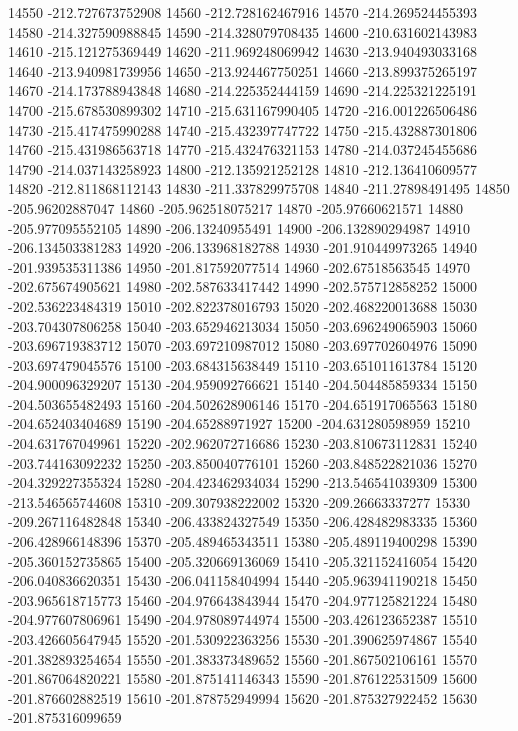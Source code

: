 {14550 -212.727673752908
14560 -212.728162467916
14570 -214.269524455393
14580 -214.327590988845
14590 -214.328079708435
14600 -210.631602143983
14610 -215.121275369449
14620 -211.969248069942
14630 -213.940493033168
14640 -213.940981739956
14650 -213.924467750251
14660 -213.899375265197
14670 -214.173788943848
14680 -214.225352444159
14690 -214.225321225191
14700 -215.678530899302
14710 -215.631167990405
14720 -216.001226506486
14730 -215.417475990288
14740 -215.432397747722
14750 -215.432887301806
14760 -215.431986563718
14770 -215.432476321153
14780 -214.037245455686
14790 -214.037143258923
14800 -212.135921252128
14810 -212.136410609577
14820 -212.811868112143
14830 -211.337829975708
14840 -211.27898491495
14850 -205.96202887047
14860 -205.962518075217
14870 -205.97660621571
14880 -205.977095552105
14890 -206.13240955491
14900 -206.132890294987
14910 -206.134503381283
14920 -206.133968182788
14930 -201.910449973265
14940 -201.939535311386
14950 -201.817592077514
14960 -202.67518563545
14970 -202.675674905621
14980 -202.587633417442
14990 -202.575712858252
15000 -202.536223484319
15010 -202.822378016793
15020 -202.468220013688
15030 -203.704307806258
15040 -203.652946213034
15050 -203.696249065903
15060 -203.696719383712
15070 -203.697210987012
15080 -203.697702604976
15090 -203.697479045576
15100 -203.684315638449
15110 -203.651011613784
15120 -204.900096329207
15130 -204.959092766621
15140 -204.504485859334
15150 -204.503655482493
15160 -204.502628906146
15170 -204.651917065563
15180 -204.652403404689
15190 -204.65288971927
15200 -204.631280598959
15210 -204.631767049961
15220 -202.962072716686
15230 -203.810673112831
15240 -203.744163092232
15250 -203.850040776101
15260 -203.848522821036
15270 -204.329227355324
15280 -204.423462934034
15290 -213.546541039309
15300 -213.546565744608
15310 -209.307938222002
15320 -209.26663337277
15330 -209.267116482848
15340 -206.433824327549
15350 -206.428482983335
15360 -206.428966148396
15370 -205.489465343511
15380 -205.489119400298
15390 -205.360152735865
15400 -205.320669136069
15410 -205.321152416054
15420 -206.040836620351
15430 -206.041158404994
15440 -205.963941190218
15450 -203.965618715773
15460 -204.976643843944
15470 -204.977125821224
15480 -204.977607806961
15490 -204.978089744974
15500 -203.426123652387
15510 -203.426605647945
15520 -201.530922363256
15530 -201.390625974867
15540 -201.382893254654
15550 -201.383373489652
15560 -201.867502106161
15570 -201.867064820221
15580 -201.875141146343
15590 -201.876122531509
15600 -201.876602882519
15610 -201.878752949994
15620 -201.875327922452
15630 -201.875316099659
}
